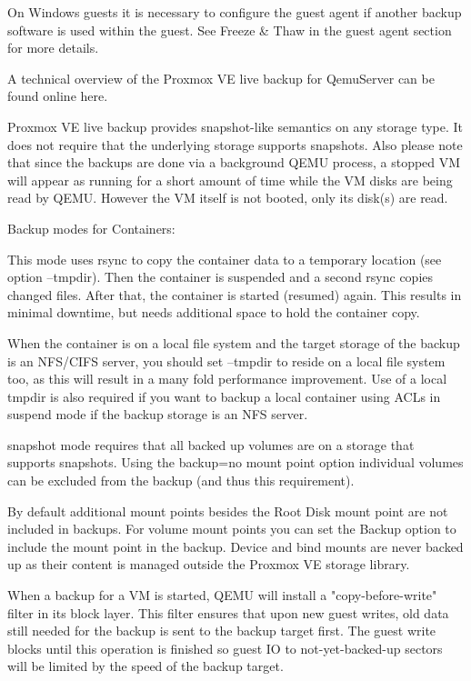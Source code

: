On Windows guests it is necessary to configure the guest agent if another backup software is used within the guest. See Freeze & Thaw in the guest agent section for more details.

A technical overview of the Proxmox VE live backup for QemuServer can be found online here.

Proxmox VE live backup provides snapshot-like semantics on any storage type. It does not require that the underlying storage supports snapshots. Also please note that since the backups are done via a background QEMU process, a stopped VM will appear as running for a short amount of time while the VM disks are being read by QEMU. However the VM itself is not booted, only its disk(s) are read.

Backup modes for Containers:

This mode uses rsync to copy the container data to a temporary location (see option --tmpdir). Then the container is suspended and a second rsync copies changed files. After that, the container is started (resumed) again. This results in minimal downtime, but needs additional space to hold the container copy.

When the container is on a local file system and the target storage of the backup is an NFS/CIFS server, you should set --tmpdir to reside on a local file system too, as this will result in a many fold performance improvement. Use of a local tmpdir is also required if you want to backup a local container using ACLs in suspend mode if the backup storage is an NFS server.

snapshot mode requires that all backed up volumes are on a storage that supports snapshots. Using the backup=no mount point option individual volumes can be excluded from the backup (and thus this requirement).

By default additional mount points besides the Root Disk mount point are not included in backups. For volume mount points you can set the Backup option to include the mount point in the backup. Device and bind mounts are never backed up as their content is managed outside the Proxmox VE storage library.

When a backup for a VM is started, QEMU will install a "copy-before-write" filter in its block layer. This filter ensures that upon new guest writes, old data still needed for the backup is sent to the backup target first. The guest write blocks until this operation is finished so guest IO to not-yet-backed-up sectors will be limited by the speed of the backup target.

